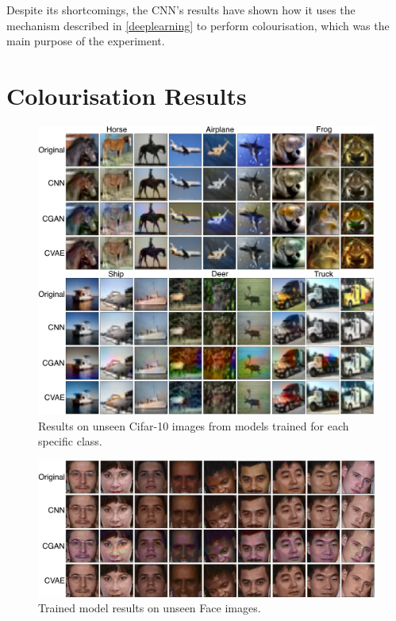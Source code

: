 \documentclass{l4proj}
\begin{document}
Despite its shortcomings, the CNN's results have shown how it uses the mechanism described in \ref{deeplearning} to perform colourisation, which was the main purpose of the experiment.

\section{Colourisation Results}

\begin{figure}[H]
    \centering
    \includegraphics[width=1.0\linewidth]{images/Cifar10Eval.png}    
    \caption{Results on unseen Cifar-10 images from models trained for each specific class.}
    \label{fig:cifar10eval} 
\end{figure}

\begin{figure}[H]
    \includegraphics[width=1.0\linewidth]{images/FaceEval.png}   
    \caption{Trained model results on unseen Face images.}
    \label{fig:faceeval} 
\end{figure}
\end{document}
